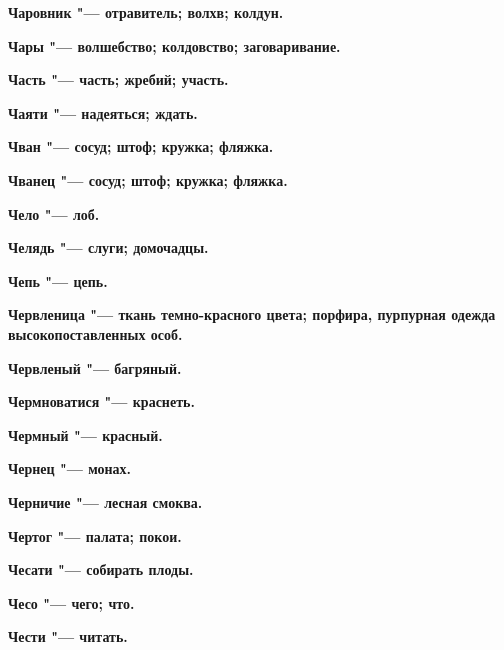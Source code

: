 \begin{mymulticols}{2}
\bfseries Чаровник\normalfont{} "--- отравитель; волхв; колдун. 




\bfseries Чары\normalfont{} "--- волшебство; колдовство; заговаривание. 




\bfseries Часть\normalfont{} "--- часть; жребий; участь. 




\bfseries Чаяти\normalfont{} "--- надеяться; ждать. 




\bfseries Чван\normalfont{} "--- сосуд; штоф; кружка; фляжка. 




\bfseries Чванец\normalfont{} "--- сосуд; штоф; кружка; фляжка. 




\bfseries Чело\normalfont{} "--- лоб. 




\bfseries Челядь\normalfont{} "--- слуги; домочадцы. 




\bfseries Чепь\normalfont{} "--- цепь. 




\bfseries Червленица\normalfont{} "--- ткань темно-красного цвета; порфира, пурпурная одежда высокопоставленных особ. 




\bfseries Червленый\normalfont{} "--- багряный. 




\bfseries Чермноватися\normalfont{} "--- краснеть. 




\bfseries Чермный\normalfont{} "--- красный. 




\bfseries Чернец\normalfont{} "--- монах. 




\bfseries Черничие\normalfont{} "--- лесная смоква. 




\bfseries Чертог\normalfont{} "--- палата; покои. 




\bfseries Чесати\normalfont{} "--- собирать плоды. 




\bfseries Чесо\normalfont{} "--- чего; что. 




\bfseries Чести\normalfont{} "--- читать. 





\end{mymulticols}
